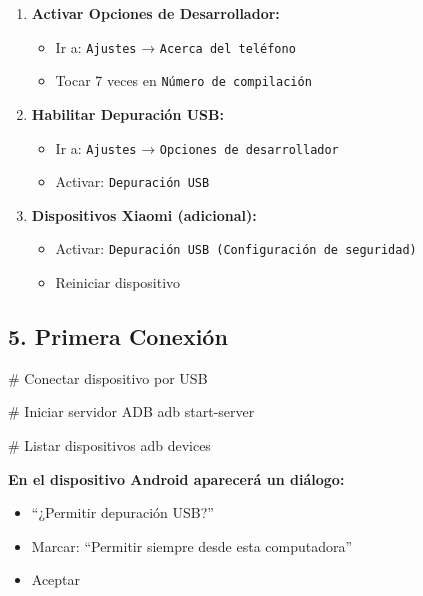 \documentclass[
  doc,
  floatsintext,
  longtable,
  a4paper,
  nolmodern,
  notxfonts,
  notimes,
  12pt,
  colorlinks=true,linkcolor=blue,citecolor=blue,urlcolor=blue]{apa7}
\newenvironment{Shaded}{\begin{snugshade}}{\end{snugshade}}
\newcommand{\CommentTok}[1]{\textcolor[rgb]{0.37,0.37,0.37}{#1}}
\newcommand{\ExtensionTok}[1]{\textcolor[rgb]{0.00,0.23,0.31}{#1}}
\newcommand{\NormalTok}[1]{\textcolor[rgb]{0.00,0.23,0.31}{#1}}
\providecommand{\tightlist}{%
  \setlength{\itemsep}{0pt}\setlength{\parskip}{0pt}}
\begin{document}
\begin{enumerate}
\def\labelenumi{\arabic{enumi}.}
\item
  \textbf{Activar Opciones de Desarrollador:}

  \begin{itemize}
  \tightlist
  \item
    Ir a: \texttt{Ajustes} → \texttt{Acerca\ del\ teléfono}
  \item
    Tocar 7 veces en \texttt{Número\ de\ compilación}
  \end{itemize}
\item
  \textbf{Habilitar Depuración USB:}

  \begin{itemize}
  \tightlist
  \item
    Ir a: \texttt{Ajustes} → \texttt{Opciones\ de\ desarrollador}
  \item
    Activar: \texttt{Depuración\ USB}
  \end{itemize}
\item
  \textbf{Dispositivos Xiaomi (adicional):}

  \begin{itemize}
  \tightlist
  \item
    Activar: \texttt{Depuración\ USB\ (Configuración\ de\ seguridad)}
  \item
    Reiniciar dispositivo
  \end{itemize}
\end{enumerate}

\subsection{5. Primera Conexión}\label{primera-conexiuxf3n}

\begin{Shaded}
\begin{Highlighting}[]
\CommentTok{\# Conectar dispositivo por USB}

\CommentTok{\# Iniciar servidor ADB}
\ExtensionTok{adb}\NormalTok{ start{-}server}

\CommentTok{\# Listar dispositivos}
\ExtensionTok{adb}\NormalTok{ devices}
\end{Highlighting}
\end{Shaded}

\textbf{En el dispositivo Android aparecerá un diálogo:}

\begin{itemize}
\tightlist
\item
  ``¿Permitir depuración USB?''
\item
  Marcar: ``Permitir siempre desde esta computadora''
\item
  Aceptar
\end{itemize}
\end{document}
